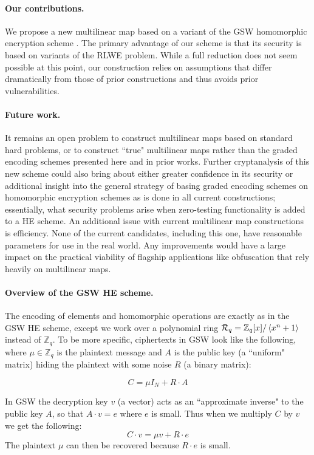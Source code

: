 \paragraph{Our contributions.}  We propose a new multilinear map based on a variant of the GSW homomorphic encryption scheme \cite{gsw}.  The primary advantage of our scheme is that its security is based on variants of the RLWE problem.  While a full reduction does not seem possible at this point, our construction relies on assumptions that differ dramatically from those of prior constructions and thus avoids prior vulnerabilities.     

\paragraph{Future work.}  It remains an open problem to construct multilinear maps based on standard hard problems, or to construct ``true" multilinear maps rather than the graded encoding schemes presented here and in prior works.  Further cryptanalysis of this new scheme could also bring about either greater confidence in its security or additional insight into the general strategy of basing graded encoding schemes on homomorphic encryption schemes as is done in all current constructions; essentially, what security problems arise when zero-testing functionality is added to a HE scheme.  An additional issue with current multilinear map constructions is efficiency.  None of the current candidates, including this one, have reasonable parameters for use in the real world.  Any improvements would have a large impact on the practical viability of flagship applications like obfuscation that rely heavily on multilinear maps.

\paragraph{Overview of the GSW HE scheme.}  The encoding of elements and homomorphic operations are exactly as in the GSW HE scheme, except we work over a polynomial ring $\mathcal{R}_q = \mathbb{Z}_q[x] / \left<x^n + 1\right>$ instead of $\mathbb{Z}_q$.  To be more specific, ciphertexts in GSW look like the following, where $\mu \in \mathbb{Z}_q$ is the plaintext message and $A$ is the public key (a ``uniform" matrix) hiding the plaintext with some noise $R$ (a binary matrix):

$$C = \mu I_N + R\cdot A$$

In GSW the decryption key $v$ (a vector) acts as an ``approximate inverse" to the public key $A$, so that $A\cdot v = e$ where $e$ is small.  Thus when we multiply $C$ by $v$ we get the following:
\begin{equation}
\label{gswintro}
C\cdot v = \mu v + R\cdot e
\end{equation}
The plaintext $\mu$ can then be recovered because $R\cdot e$ is small.    

